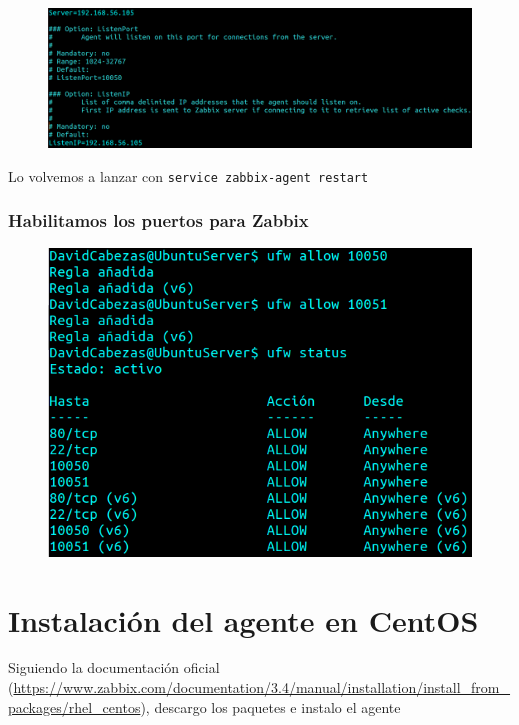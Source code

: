\documentclass{article}
\begin{document}
\begin{figure}[H]
  \centering
  \includegraphics[width=160mm]{screenshots/us_agent-conf}
\end{figure}

Lo volvemos a lanzar con \texttt{service zabbix-agent restart}

\subsubsection*{Habilitamos los puertos para Zabbix}

\begin{figure}[H]
  \centering
  \includegraphics[width=120mm]{screenshots/ufw-allow}
\end{figure}

\newpage

\section{Instalación del agente en CentOS}

Siguiendo la documentación oficial
(\url{https://www.zabbix.com/documentation/3.4/manual/installation/install_from_packages/rhel_centos}),
descargo los paquetes e instalo el agente
\end{document}
